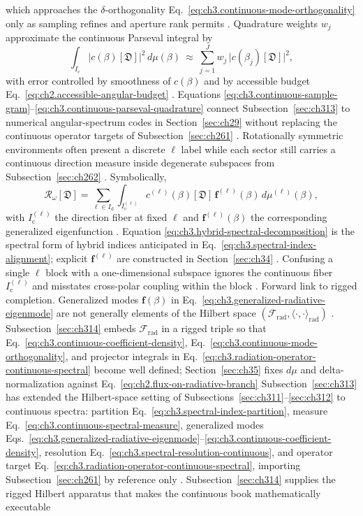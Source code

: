which approaches the \(\delta\)-orthogonality Eq.~\eqref{eq:ch3.continuous-mode-orthogonality} only as
sampling refines and aperture rank permits . Quadrature weights
\(w_j\) approximate the continuous Parseval integral by
\begin{equation}
\label{eq:ch3.continuous-parseval-quadrature}
\int_{I_{\mathrm{c}}}
|c(\beta)[\mathfrak{D}]|^{2}\,d\mu(\beta)
\ \approx\
\sum_{j=1}^{J} w_j\,\big|c(\beta_j)[\mathfrak{D}]\big|^{2},
\end{equation}
with error controlled by smoothness of \(c(\beta)\) and by accessible budget
Eq.~\eqref{eq:ch2.accessible-angular-budget} . Equations
\eqref{eq:ch3.continuous-sample-gram}--\eqref{eq:ch3.continuous-parseval-quadrature} connect
Subsection~\ref{sec:ch313} to numerical angular-spectrum codes in Section~\ref{sec:ch29} without
replacing the continuous operator targets of Subsection~\ref{sec:ch261} .
Rotationally symmetric environments often present a discrete \(\ell\) label while each sector still
carries a continuous direction measure inside degenerate subspaces from Subsection~\ref{sec:ch262}
. Symbolically,
\begin{equation}
\label{eq:ch3.hybrid-spectral-decomposition}
\mathcal{R}_\omega[\mathfrak{D}]
=
\sum_{\ell\in I_{\mathrm{d}}}
\int_{I_{\mathrm{c}}^{(\ell)}}
c^{(\ell)}(\beta)[\mathfrak{D}]\,\mathbf{f}^{(\ell)}(\beta)\,d\mu^{(\ell)}(\beta),
\end{equation}
with \(I_{\mathrm{c}}^{(\ell)}\) the direction fiber at fixed \(\ell\) and \(\mathbf{f}^{(\ell)}(\beta)\)
the corresponding generalized eigenfunction . Equation
\eqref{eq:ch3.hybrid-spectral-decomposition} is the spectral form of hybrid indices anticipated in
Eq.~\eqref{eq:ch3.spectral-index-alignment}; explicit \(\mathbf{f}^{(\ell)}\) are constructed in
Section~\ref{sec:ch34} . Confusing a single \(\ell\) block with a
one-dimensional subspace ignores the continuous fiber \(I_{\mathrm{c}}^{(\ell)}\) and misstates
cross-polar coupling within the block .
Forward link to rigged completion. Generalized modes \(\mathbf{f}(\beta)\) in Eq.~\eqref{eq:ch3.generalized-radiative-eigenmode} are not
generally elements of the Hilbert space \((\mathcal{F}_{\mathrm{rad}},\langle\cdot,\cdot\rangle_{\mathrm{rad}})\)
. Subsection~\ref{sec:ch314} embeds \(\mathcal{F}_{\mathrm{rad}}\) in a
rigged triple so that Eq.~\eqref{eq:ch3.continuous-coefficient-density},
Eq.~\eqref{eq:ch3.continuous-mode-orthogonality}, and projector integrals in
Eq.~\eqref{eq:ch3.radiation-operator-continuous-spectral} become well defined; Section~\ref{sec:ch35}
fixes \(d\mu\) and delta-normalization against Eq.~\eqref{eq:ch2.flux-on-radiative-branch}
Subsection~\ref{sec:ch313} has extended the Hilbert-space setting of Subsections~\ref{sec:ch311}--\ref{sec:ch312}
to continuous spectra: partition Eq.~\eqref{eq:ch3.spectral-index-partition}, measure
Eq.~\eqref{eq:ch3.continuous-spectral-measure}, generalized modes
Eqs.~\eqref{eq:ch3.generalized-radiative-eigenmode}--\eqref{eq:ch3.continuous-coefficient-density},
resolution Eq.~\eqref{eq:ch3.spectral-resolution-continuous}, and operator target
Eq.~\eqref{eq:ch3.radiation-operator-continuous-spectral}, importing Subsection~\ref{sec:ch261} by
reference only . Subsection~\ref{sec:ch314} supplies the
rigged Hilbert apparatus that makes the continuous book mathematically executable

